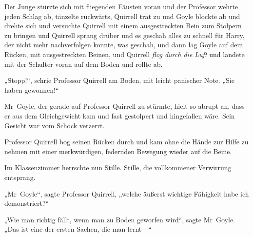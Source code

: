 Der Junge stürzte sich mit fliegenden Fäusten voran und der Professor wehrte jeden Schlag ab, tänzelte rückwärts, Quirrell trat zu und Goyle blockte ab und drehte sich und versuchte Quirrell mit einem ausgestreckten Bein zum Stolpern zu bringen und Quirrell sprang drüber und es geschah alles zu schnell für Harry, der nicht mehr nachverfolgen konnte, was geschah, und dann lag Goyle auf dem Rücken, mit ausgestreckten Beinen, und Quirrell \emph{flog durch die Luft} und landete mit der Schulter voran auf dem Boden und rollte ab.

„Stopp!“, schrie Professor Quirrell am Boden, mit leicht panischer Note. „Sie haben gewonnen!“

Mr~Goyle, der gerade auf Professor Quirrell zu stürmte, hielt so abrupt an, dass er aus dem Gleichgewicht kam und fast gestolpert und hingefallen wäre. Sein Gesicht war vom Schock verzerrt.

Professor Quirrell bog seinen Rücken durch und kam ohne die Hände zur Hilfe zu nehmen mit einer merkwürdigen, federnden Bewegung wieder auf die Beine.

Im Klassenzimmer herrschte nun Stille. Stille, die vollkommener Verwirrung entsprang.

„Mr~Goyle“, sagte Professor Quirrell, „welche äußerst wichtige Fähigkeit habe ich demonstriert?“

„Wie man richtig fällt, wenn man zu Boden geworfen wird“, sagte Mr~Goyle. „Das ist eine der ersten Sachen, die man lernt—“

